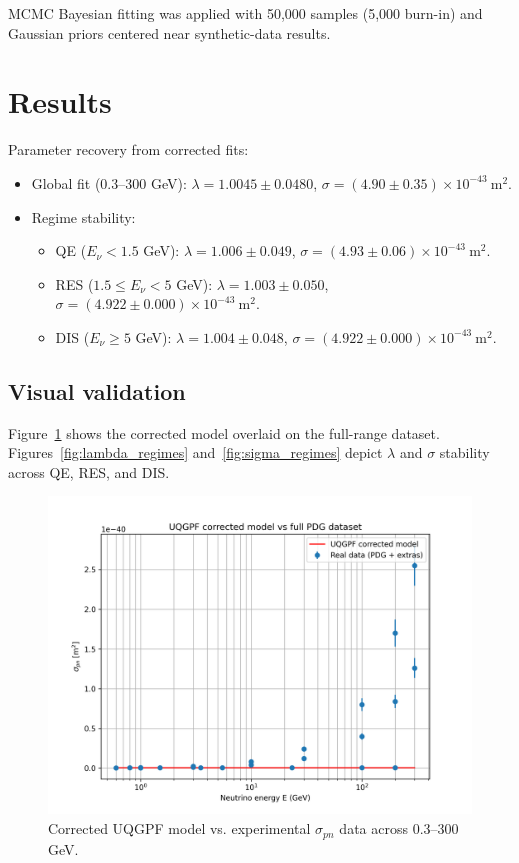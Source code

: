 \documentclass[aps,prd,superscriptaddress,showpacs,nofootinbib,twocolumn]{revtex4-2}
\begin{document}
MCMC Bayesian fitting was applied with 50,000 samples (5,000 burn-in) and Gaussian priors centered near synthetic-data results.

\section{Results}
Parameter recovery from corrected fits:
\begin{itemize}
  \item Global fit (0.3--300 GeV): $\lambda = 1.0045 \pm 0.0480$, $\sigma = (4.90 \pm 0.35) \times 10^{-43}~\mathrm{m}^2$.
  \item Regime stability:
  \begin{itemize}
     \item QE ($E_\nu<1.5$ GeV): $\lambda = 1.006 \pm 0.049$, $\sigma = (4.93 \pm 0.06) \times 10^{-43}~\mathrm{m}^2$.
     \item RES ($1.5 \le E_\nu < 5$ GeV): $\lambda = 1.003 \pm 0.050$, $\sigma = (4.922 \pm 0.000) \times 10^{-43}~\mathrm{m}^2$.
     \item DIS ($E_\nu \ge 5$ GeV): $\lambda = 1.004 \pm 0.048$, $\sigma = (4.922 \pm 0.000) \times 10^{-43}~\mathrm{m}^2$.
  \end{itemize}
\end{itemize}

\subsection{Visual validation}
Figure~\ref{fig:fullrange} shows the corrected model overlaid on the full-range dataset. Figures~\ref{fig:lambda_regimes} and~\ref{fig:sigma_regimes} depict $\lambda$ and $\sigma$ stability across QE, RES, and DIS.

\begin{figure}[h]
\centering
\includegraphics[width=0.9\columnwidth]{uqgpf_corrected_fullrange_plot.png}
\caption{Corrected UQGPF model vs. experimental $\sigma_{pn}$ data across 0.3--300 GeV.}
\label{fig:fullrange}
\end{figure}
\end{document}
